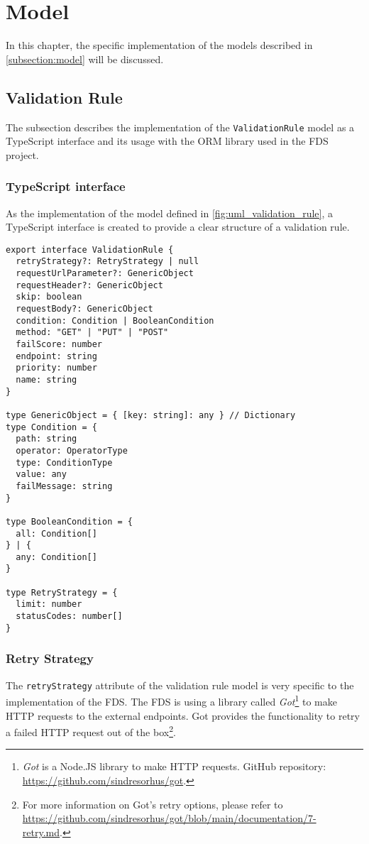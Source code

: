 \section{Model}

In this chapter, the specific implementation of the models described in \autoref{subsection:model} will be discussed. 

  \subsection{Validation Rule}

    The subsection describes the implementation of the \verb;ValidationRule; model as a TypeScript interface and its usage with the ORM library used in the FDS project. 

    \subsubsection{TypeScript interface}
      As the implementation of the model defined in \autoref{fig:uml_validation_rule}, a TypeScript interface is created to provide a clear structure of a validation rule.

      \begin{lstlisting}[style=es6, caption={TypeScript interface of a validation rule (TypeScript)}]
export interface ValidationRule {
  retryStrategy?: RetryStrategy | null
  requestUrlParameter?: GenericObject
  requestHeader?: GenericObject
  skip: boolean
  requestBody?: GenericObject
  condition: Condition | BooleanCondition
  method: "GET" | "PUT" | "POST" 
  failScore: number
  endpoint: string
  priority: number
  name: string
}

type GenericObject = { [key: string]: any } // Dictionary
type Condition = {
  path: string
  operator: OperatorType
  type: ConditionType
  value: any
  failMessage: string
}

type BooleanCondition = {
  all: Condition[]
} | {
  any: Condition[]
}

type RetryStrategy = {
  limit: number
  statusCodes: number[] 
}
      \end{lstlisting}
 
    \subsubsection{Retry Strategy}
      The \verb;retryStrategy; attribute of the validation rule model is very specific to the implementation of the FDS. The FDS is using a library called \emph{Got}\footnote{\emph{Got} is a Node.JS library to make HTTP requests. GitHub repository: \url{https://github.com/sindresorhus/got}.} to make HTTP requests to the external endpoints. Got provides the functionality to retry a failed HTTP request out of the box\footnote{For more information on Got's retry options, please refer to \url{https://github.com/sindresorhus/got/blob/main/documentation/7-retry.md}.}.

